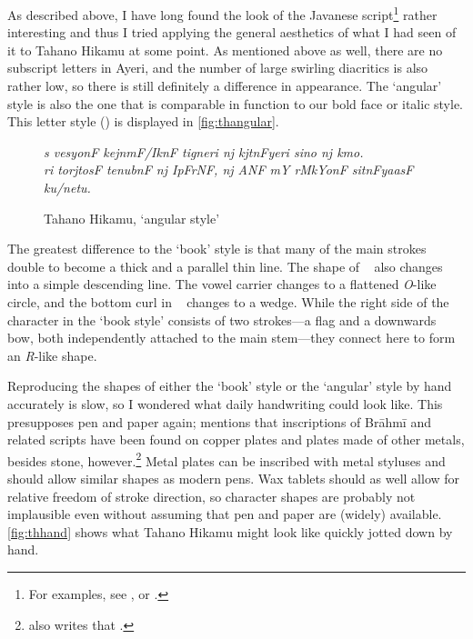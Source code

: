 As described above, I have long found the look of the Javanese
script\footnote{For examples, see \citet{everson2008}, or .}
rather interesting and thus I tried applying the general aesthetics of what I
had seen of it to Tahano Hikamu at some point. As mentioned above as well,
there are no subscript letters in Ayeri, and the number of large swirling
diacritics is also rather low, so there is still definitely a difference in
appearance. The `angular' style is also the one that is comparable in function
to our bold face or italic style. This letter style
() is displayed in \autoref{fig:thangular}.

\begin{figure}[ht]\centering
{\Tagati\itshape\Large s vesyonF kejnmF/IknF tigneri nj kjtnFyeri sino nj
kmo.\\
ri torjtosF tenubnF nj IpFrNF, nj ANF mY rMkYonF sitnFyaasF ku/netu.}
\caption{Tahano Hikamu, `angular style'}
\label{fig:thangular}
\end{figure}

The greatest difference to the `book' style is that many of the main strokes 
double to become a thick and a parallel thin line. The shape of 
~ also changes into a simple descending line. The vowel carrier
 changes to a flattened \textit{O}-like circle, and the bottom curl in
~ changes to a wedge. While the right side of the
~ character in the `book style' consists of two strokes---a
flag and a downwards bow, both independently attached to the main stem---they
connect here to form an \emph{R}-like shape.

 Reproducing the shapes of either
the `book' style or the `angular' style by hand accurately is slow, so I
wondered what daily handwriting could look like. This presupposes pen and paper
again; \citet[377]{salomon1996} mentions that inscriptions of Brāhmī and
related scripts have been found on copper plates and plates made of other
metals, besides stone, however.\footnote{\citet{salomon1996} also writes that
.} Metal plates can be inscribed with metal
styluses and should allow similar shapes as modern pens. Wax tablets should as
well allow for relative freedom of stroke direction, so character shapes are
probably not implausible even without assuming that pen and paper are (widely)
available. \autoref{fig:thhand} shows what Tahano Hikamu might look like
quickly jotted down by hand.

